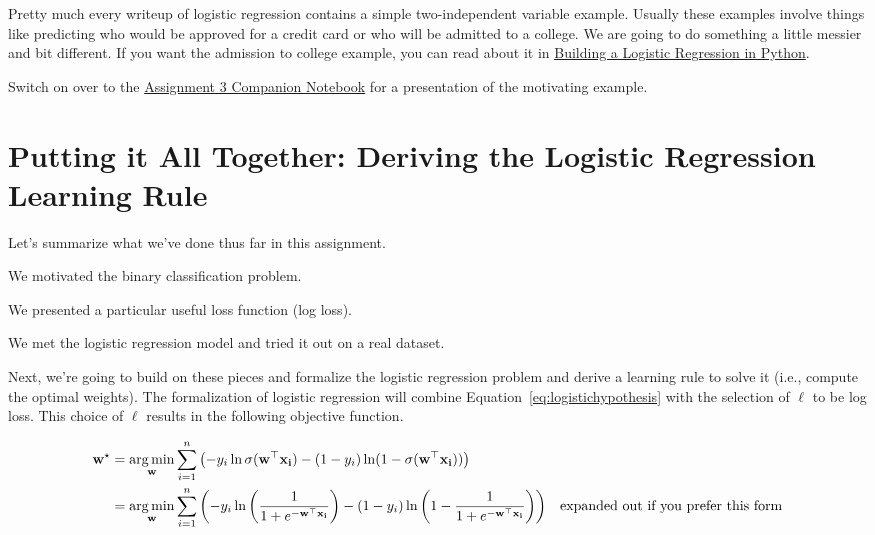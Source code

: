 \documentclass[assignment04_Solutions]{subfiles}
\begin{document}
\begin{notice}
Pretty much every writeup of logistic regression contains a simple two-independent variable example.  Usually these examples involve things like predicting who would be approved for a credit card or who will be admitted to a college.  We are going to do something a little messier and bit different.  If you want the admission to college example, you can read about it in \href{https://towardsdatascience.com/building-a-logistic-regression-in-python-301d27367c24}{Building a Logistic Regression in Python}.
\end{notice}

\begin{externalresources}[(60 minutes)]
Switch on over to the \href{https://colab.research.google.com/github/mlfa19/assignments/blob/master/Module\%201/03/Assignment_03_Companion.ipynb}{Assignment 3 Companion Notebook} for a presentation of the motivating example.
\end{externalresources}

\section{Putting it All Together: Deriving the Logistic Regression Learning Rule}
Let's summarize what we've done thus far in this assignment.

\bi
\item We motivated the binary classification problem.
\item We presented a particular useful loss function (log loss).
\item We met the logistic regression model and tried it out on a real dataset.
\ei

Next, we're going to build on these pieces and formalize the logistic regression problem and derive a learning rule to solve it (i.e., compute the optimal weights). The formalization of logistic regression will combine Equation~\ref{eq:logistichypothesis} with the selection of $\ell$ to be log loss.  This choice of $\ell$ results in the following objective function.

\begin{align}
\mathbf{w}^\star &= \operatorname*{arg\,min}_{\mathbf{w}} \sum_{i=1}^n \left ( - y_i \ln \sigma(\mathbf{w}^\top \mathbf{x_i}) - (1-y_i) \ln (1 - \sigma(\mathbf{w}^\top \mathbf{x_i}) ) \right) \\
&= \operatorname*{arg\,min}_{\mathbf{w}} \sum_{i=1}^n \left (  - y_i \ln \left ( \frac{1}{1+e^{-\mathbf{w}^\top \mathbf{x_i}}} \right) - (1-y_i) \ln  \left (1 - \frac{1}{1+e^{-\mathbf{w}^\top \mathbf{x_i}}} \right ) \right) &\mbox{expanded out if you prefer this form} \label{eq:objective}
\end{align}
\end{document}

